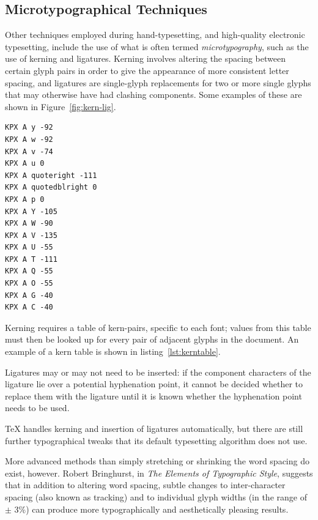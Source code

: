 \subsection{Microtypographical Techniques}
\label{sec:microtypography}
Other techniques employed during hand-type\-set\-t\-ing, and high-qua\-l\-ity electronic typesetting, include the use of what is often termed \emph{micro\-typo\-graphy},\hspace{0pt}\cite{Hurst2009} such as the use of kerning and ligatures. Kerning involves altering the spacing between certain glyph pairs in order to give the appearance of more consistent letter spacing, and ligatures are sin\-gle-glyph replacements for two or more single glyphs that may otherwise have had clashing components. Some examples of these are shown in Figure~\ref{fig:kern-lig}.

\begin{lstlisting}[label=lst:kerntable,captionpos=b,float,basicstyle=\ttfamily\footnotesize,caption={[Excerpt from a kern table]An excerpt from a kern table for Times Roman, showing kern pairs beginning with \texttt{A} only. This is taken from an AFM (Adobe Font Metrics) file, where the units are (according to the specification\cite{ASI1998}) ``\emph{equal to 1/1000 of the scale factor (point size) of the font being used}''.}]
KPX A y -92
KPX A w -92
KPX A v -74
KPX A u 0
KPX A quoteright -111
KPX A quotedblright 0
KPX A p 0
KPX A Y -105
KPX A W -90
KPX A V -135
KPX A U -55
KPX A T -111
KPX A Q -55
KPX A O -55
KPX A G -40
KPX A C -40
\end{lstlisting}

Kerning requires a table of kern-pairs, specific to each font; values from this table must then be looked up for every pair of adjacent glyphs in the document. An example of a kern table is shown in listing~\ref{lst:kerntable}.

Ligatures may or may not need to be inserted: if the component characters of the ligature lie over a potential hyphenation point, it cannot be decided whether to replace them with the ligature until it is known whether the hyphenation point needs to be used.

\TeX{} handles kerning and insertion of ligatures automatically, but there are still further typographical tweaks that its default typesetting algorithm does not use.

More advanced methods than simply stretching or shrinking the word spacing do exist, however. Robert Bringhurst, in \emph{The Elements of Typographic Style},\hspace{0pt}\cite{Bringhurst2008} suggests that in addition to altering word spacing, subtle changes to inter-character spacing (also known as \gls{tracking}) and to individual glyph widths (in the range of $\pm$ 3\%) can produce more typographically and aesthetically pleasing results.





